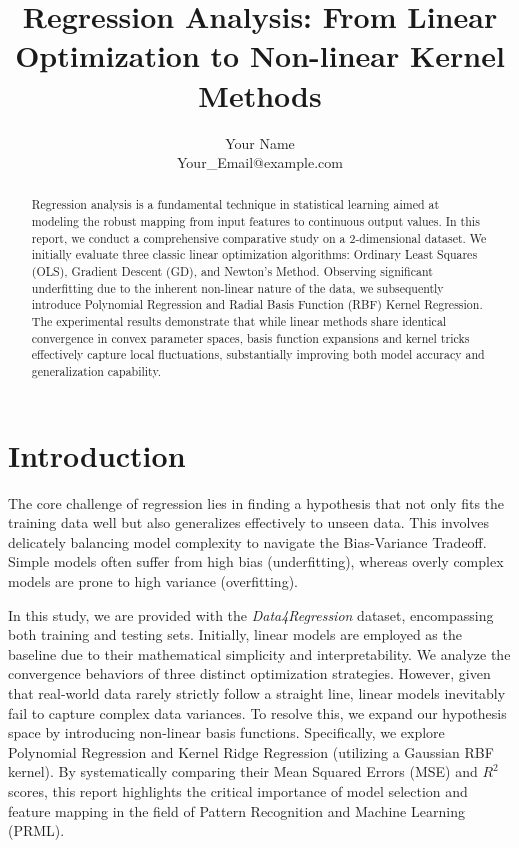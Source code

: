 \documentclass[12pt,a4paper]{article}
\title{\textbf{\Large Regression Analysis: From Linear Optimization to Non-linear Kernel Methods}}
\author{Your Name\\ 
Your\_Email@example.com} %
\date{}
\begin{document}
\maketitle 

\begin{abstract}
Regression analysis is a fundamental technique in statistical learning aimed at modeling the robust mapping from input features to continuous output values. In this report, we conduct a comprehensive comparative study on a 2-dimensional dataset. We initially evaluate three classic linear optimization algorithms: Ordinary Least Squares (OLS), Gradient Descent (GD), and Newton's Method. Observing significant underfitting due to the inherent non-linear nature of the data, we subsequently introduce Polynomial Regression and Radial Basis Function (RBF) Kernel Regression. The experimental results demonstrate that while linear methods share identical convergence in convex parameter spaces, basis function expansions and kernel tricks effectively capture local fluctuations, substantially improving both model accuracy and generalization capability.
\end{abstract}

\section*{Introduction}
The core challenge of regression lies in finding a hypothesis that not only fits the training data well but also generalizes effectively to unseen data. This involves delicately balancing model complexity to navigate the Bias-Variance Tradeoff. Simple models often suffer from high bias (underfitting), whereas overly complex models are prone to high variance (overfitting). 

In this study, we are provided with the \textit{Data4Regression} dataset, encompassing both training and testing sets. Initially, linear models are employed as the baseline due to their mathematical simplicity and interpretability. We analyze the convergence behaviors of three distinct optimization strategies. However, given that real-world data rarely strictly follow a straight line, linear models inevitably fail to capture complex data variances. To resolve this, we expand our hypothesis space by introducing non-linear basis functions. Specifically, we explore Polynomial Regression and Kernel Ridge Regression (utilizing a Gaussian RBF kernel). By systematically comparing their Mean Squared Errors (MSE) and $R^2$ scores, this report highlights the critical importance of model selection and feature mapping in the field of Pattern Recognition and Machine Learning (PRML).
\end{document}
